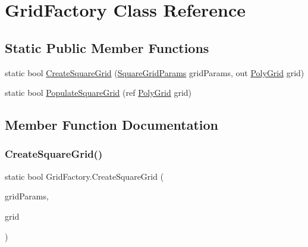 \hypertarget{class_grid_factory}{}\section{Grid\+Factory Class Reference}
\label{class_grid_factory}
\subsection*{Static Public Member Functions}
\begin{DoxyCompactItemize}
\item 
static bool \mbox{\hyperlink{class_grid_factory_ae31ccb1316ff0273b63f3d9b099be036}{Create\+Square\+Grid}} (\mbox{\hyperlink{struct_square_grid_params}{Square\+Grid\+Params}} grid\+Params, out \mbox{\hyperlink{class_poly_grid}{Poly\+Grid}} grid)
\item 
static bool \mbox{\hyperlink{class_grid_factory_a4878217f8fa48b3ed205e9b4a6e863e2}{Populate\+Square\+Grid}} (ref \mbox{\hyperlink{class_poly_grid}{Poly\+Grid}} grid)
\end{DoxyCompactItemize}


\subsection{Member Function Documentation}
\mbox{\label{class_grid_factory_ae31ccb1316ff0273b63f3d9b099be036}} 
\subsubsection{\texorpdfstring{Create\+Square\+Grid()}{CreateSquareGrid()}}
{\footnotesize\ttfamily static bool Grid\+Factory.\+Create\+Square\+Grid (\begin{DoxyParamCaption}\item[{\mbox{\hyperlink{struct_square_grid_params}{Square\+Grid\+Params}}}]{grid\+Params,  }\item[{out \mbox{\hyperlink{class_poly_grid}{Poly\+Grid}}}]{grid }\end{DoxyParamCaption})\hspace{0.3cm}{\ttfamily [static]}}

\mbox{\label{class_grid_factory_a4878217f8fa48b3ed205e9b4a6e863e2}} 
